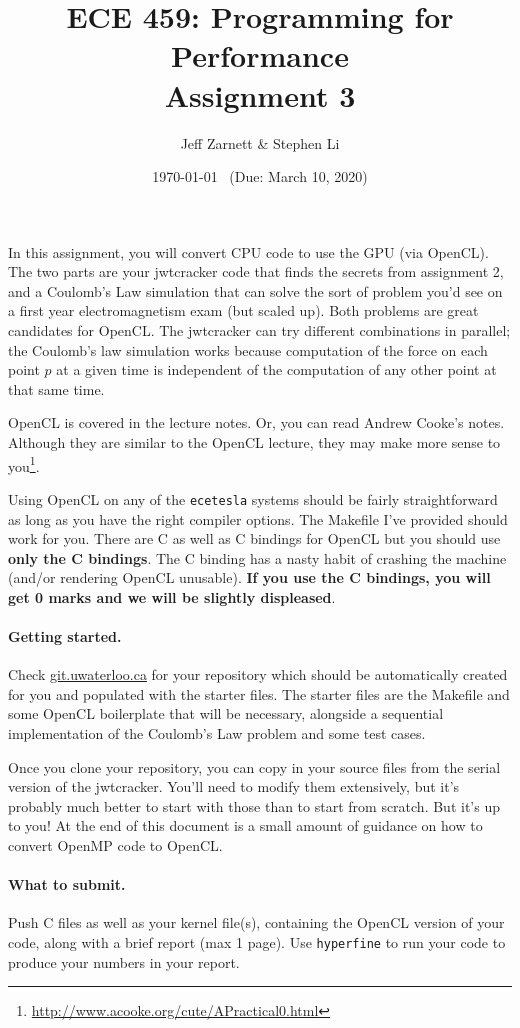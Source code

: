 \documentclass[letterpaper,10pt]{article}
\title{\bf ECE 459: Programming for Performance\\Assignment 3}
\author{Jeff Zarnett \& Stephen Li}
\date{\today ~ (Due: March 10, 2020)}
\newcommand{\Rplus}{\protect\hspace{-.1em}\protect\raisebox{.35ex}{\smaller{\smaller\textbf{+}}}}
\newcommand{\Cpp}{\mbox{C\Rplus\Rplus}\xspace}
\begin{document}
\maketitle

In this assignment, you will convert CPU code to use the GPU (via OpenCL). 
The two parts are your jwtcracker code that finds the secrets
from assignment 2, and a Coulomb's Law  simulation that can solve the 
sort of problem you'd see on a first year electromagnetism exam (but scaled up).
Both problems are great candidates for OpenCL. The jwtcracker can try different
combinations in parallel; the Coulomb's law simulation works because computation
 of the force on each point $p$ at a given time is
independent of the computation of any other point at that same time. 

OpenCL is covered in the lecture notes. Or, you can read Andrew Cooke's notes. Although 
they are similar to the OpenCL lecture, they may make more sense to you\footnote{\url{http://www.acooke.org/cute/APractical0.html}}.

Using OpenCL on any of the \texttt{ecetesla} systems
 should be fairly straightforward as long as
you have the right compiler options. The Makefile I've provided
should work for you. There are \Cpp as well as C bindings for OpenCL but you 
should use \textbf{only the \Cpp bindings}. The C binding has a nasty habit of 
crashing the machine (and/or rendering OpenCL unusable). \textbf{If you use the C bindings, 
you will get 0 marks and we will be slightly displeased}.

\paragraph{Getting started.} 
Check \url{git.uwaterloo.ca} for your repository which should 
be automatically created for you and populated with the starter files. The starter 
files are the Makefile and some OpenCL boilerplate that will be necessary, alongside 
a sequential implementation of the Coulomb's Law problem and some test cases.


Once you clone your repository, you can copy in your source files from 
the serial version of the jwtcracker.
You'll need to 
modify them extensively, but it's probably much better to start 
with those than to 
start from scratch. But it's up to you! At the end of this document 
is a small amount
of guidance on how to convert OpenMP code to OpenCL.


\paragraph{What to submit.} Push \Cpp files as well as your kernel file(s), containing 
the OpenCL version of your code, along with a brief report (max 1 page).
Use \texttt{hyperfine} to run your code to produce
your numbers in your report.
\end{document}
